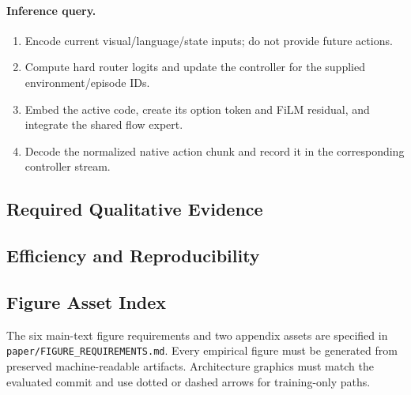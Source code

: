 \paragraph{Inference query.}
\begin{enumerate}
    \item Encode current visual/language/state inputs; do not provide future
    actions.
    \item Compute hard router logits and update the controller for the supplied
    environment/episode IDs.
    \item Embed the active code, create its option token and FiLM residual, and
    integrate the shared flow expert.
    \item Decode the normalized native action chunk and record it in the
    corresponding controller stream.
\end{enumerate}

\subsection{Required Qualitative Evidence}




\subsection{Efficiency and Reproducibility}




\subsection{Figure Asset Index}

The six main-text figure requirements and two appendix assets are specified in
\texttt{paper/FIGURE\_REQUIREMENTS.md}.  Every empirical figure must be
generated from preserved machine-readable artifacts.  Architecture graphics
must match the evaluated commit and use dotted or dashed arrows for
training-only paths.
